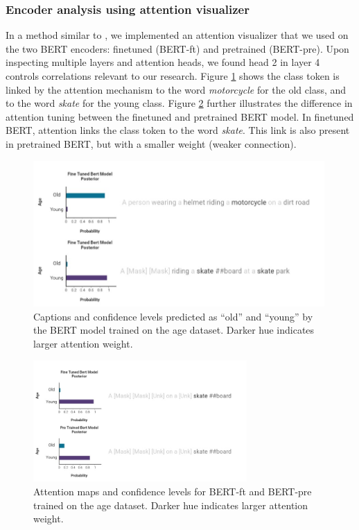 \subsubsection{Encoder analysis using attention visualizer}
In a method similar to \citeauthor{snowboard} \cite{snowboard}, we implemented an attention visualizer that we used on the two BERT encoders: finetuned (BERT-ft) and pretrained (BERT-pre). Upon inspecting multiple layers and attention heads, we found head 2 in layer 4 controls correlations relevant to our research. Figure \ref{fig:old} shows the class token is linked by the attention mechanism to the word \textit{motorcycle} for the old class, and to the word \textit{skate} for the young class. Figure \ref{fig:vs} further illustrates the difference in attention tuning between the finetuned and pretrained BERT model. In finetuned BERT, attention links the class token to the word \textit{skate}. This link is also present in pretrained BERT, but with a smaller weight (weaker connection).

\begin{figure}[h]
    \centering
    \includegraphics[width= 30em]{images/young-old.jpeg}
    \caption{Captions and confidence levels predicted as ``old'' and ``young'' by the BERT model trained on the age dataset. Darker hue indicates larger attention weight.}
    \label{fig:old}
\end{figure}

\begin{figure}[h]
    \centering
    \includegraphics[width=22em]{images/fine-pre.jpeg}
    \caption{Attention maps and confidence levels for BERT-ft and BERT-pre trained on the age dataset. Darker hue indicates larger attention weight.}
    \label{fig:vs}
\end{figure}


